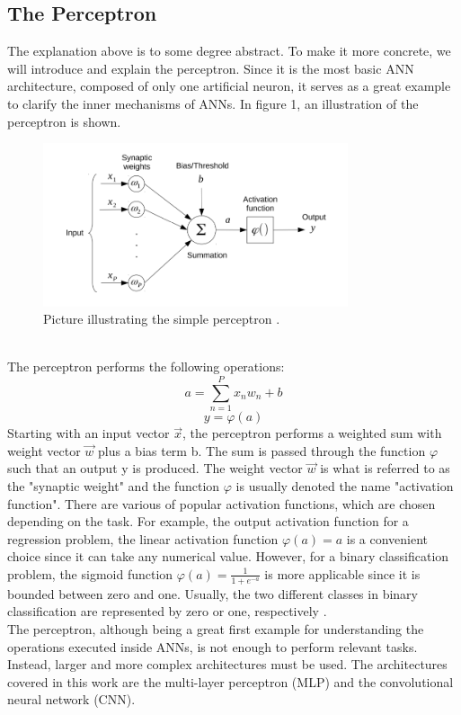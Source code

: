 \documentclass{article}
\begin{document}
\subsection{The Perceptron}
The explanation above is to some degree abstract. To make it more concrete, we will introduce and explain the perceptron. Since it is the most basic ANN architecture, composed of only one artificial neuron, it serves as a great example to clarify the inner mechanisms of ANNs. In figure 1, an illustration of the perceptron is shown. 
\begin{figure}[h!] 
	\centering
	\includegraphics[width=0.8\textwidth]{Simple_preceptron.png}
	\caption{Picture illustrating the simple perceptron \cite{Lecturenotes}.}
	\label{fig:Simple-perceptron}
\end{figure} \\
The perceptron performs the following operations:
\begin{equation}
    a=\sum_{n=1}^{P}x_nw_n+b 
\end{equation}
\begin{equation}
     y=\varphi(a)
\end{equation}
Starting with an input vector $\Vec{x}$, the perceptron performs a weighted sum with weight vector $\Vec{w}$ plus a bias term b. The sum is passed through the function $\varphi$ such that an output y is produced. The weight vector $\Vec{w}$ is what is referred to as the "synaptic weight" and the function $\varphi$ is usually denoted the name "activation function". There are various of popular activation functions, which are chosen depending on the task. For example, the output activation function for a regression problem, the linear activation function $\varphi(a)=a$ is a convenient choice since it can take any numerical value. However, for a binary classification problem, the sigmoid function $\varphi(a)=\frac{1}{1+e^{-a}}$ is more applicable since it is bounded between zero and one. Usually, the two different classes in binary classification are represented by zero or one, respectively \cite{Lecturenotes}. \\ %
The perceptron, although being a great first example for understanding the operations executed inside ANNs, is not enough to perform relevant tasks. Instead, larger and more complex architectures must be used. The architectures covered in this work are the multi-layer perceptron (MLP) and the convolutional neural network (CNN). %
\end{document}
